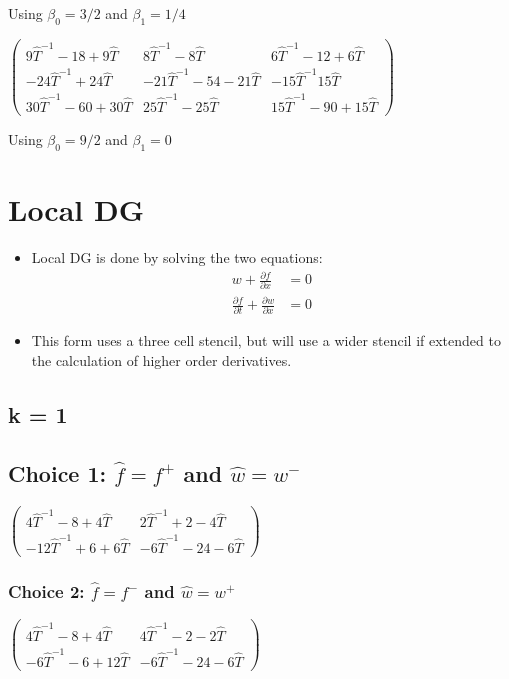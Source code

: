 \documentclass[final]{siamltex}
\begin{document}
Using $\beta_0 = 3/2$ and $\beta_1 = 1/4$

$\left(
\begin{array}{ccc}
 9 \hat{T}^{-1}-18+9 \hat{T} & 8 \hat{T}^{-1} -8 \hat{T}& 6 \hat{T}^{-1}-12+6 \hat{T} \\
 -24 \hat{T}^{-1}+24 \hat{T} & -21 \hat{T}^{-1}-54-21 \hat{T} & -15 \hat{T}^{-1}15 \hat{T} \\
 30 \hat{T}^{-1}-60+30 \hat{T} & 25 \hat{T}^{-1}-25 \hat{T} & 15 \hat{T}^{-1}-90+15 \hat{T}
\end{array}
\right)$

Using $\beta_0 = 9/2$ and $\beta_1 = 0$

\section{Local DG}
\begin{itemize}
\item Local DG is done by solving the two equations:
\begin{align*}
w + \frac{\partial f}{\partial x} &= 0\\
\frac{\partial f}{\partial t} + \frac{\partial w}{\partial x} &= 0
\end{align*}
\item This form uses a three cell stencil, but will use a wider stencil if extended to the calculation of higher order derivatives.
\end{itemize}

\subsection{k = 1}
\subsection{Choice 1: $\hat{f} = f^+$ and $\hat{w} = w^-$}
$\left(
\begin{array}{cc}
 4\hat{T}^{-1} -8+4 \hat{T} & 2\hat{T}^{-1}+2-4 \hat{T} \\
 -12 \hat{T}^{-1} +6+6 \hat{T} & -6 \hat{T}^{-1} -24-6 \hat{T}
 \end{array}\right)$
 
 \subsubsection{Choice 2: $\hat{f} = f^-$ and $\hat{w} = w^+$}
 $\left(
\begin{array}{cc}
4\hat{T}^{-1} -8+4 \hat{T} & 4\hat{T}^{-1}-2-2 \hat{T} \\
-6 \hat{T}^{-1} -6+12 \hat{T} & -6 \hat{T}^{-1} -24-6 \hat{T}
\end{array}\right)$
\end{document}
